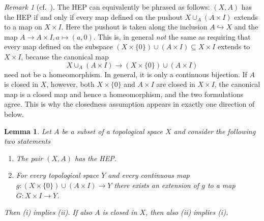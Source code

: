\documentclass[11pt, a4paper, english]{article}
\theoremstyle{plain}
\newtheorem{lemma}[theorem]{Lemma}
\theoremstyle{definition}
\theoremstyle{remark}
\newtheorem{remark}[theorem]{Remark}
\numberwithin{equation}{section}
\numberwithin{theorem}{section}
\begin{document}
\begin{remark} [cf.\ {\cite[Bemerkung~2 und 3]{WAL}}] \label{rem:pushout}
    The HEP can equivalently be phrased as follows: $(X,A)$ has the HEP if and only if every map defined on the pushout $X \cup_A (A \times I)$ extends to a map on $X \times I$. Here the pushout is taken along the inclusion $A \hookrightarrow X$ and the map $A \to A \times I, a \mapsto (a,0)$. This is, in general \emph{not} the same as requiring that every map defined on the subspace $(X \times \{0\}) \cup (A \times I) \subseteq X \times I$ extends to $X \times I$, because the canonical map
\[
    X \cup_A (A \times I) \to (X \times \{0\}) \cup (A \times I)
\]
need not be a homeomorphism. In general, it is only a continuous bijection. If $A$ is closed in $X$, however, both $X \times \{0\}$ and $A \times I$ are closed in $X \times I$, the canonical map is a closed map and hence a homeomorphism, and the two formulations agree. This is why the closedness assumption appears in exactly one direction of  below. 
\end{remark}

\begin{lemma} \label{lem:HEPextension}
    Let $A$ be a subset of a topological space $X$ and consider the following two statements
    \begin{enumerate} 
        \renewcommand{\labelenumi}{(\roman{enumi})}
        \item The pair $(X,A)$ has the HEP.
        \item For every topological space $Y$ and every continuous map $g\colon (X \times \{ 0\}) \cup (A \times I) \to Y$ there exists an extension of $g$ to a map $G \colon X \times I \to Y$.
    \end{enumerate}
    Then (i) implies (ii). If also $A$ is closed in $X$, then also (ii) implies (i).
\end{lemma}
\end{document}
